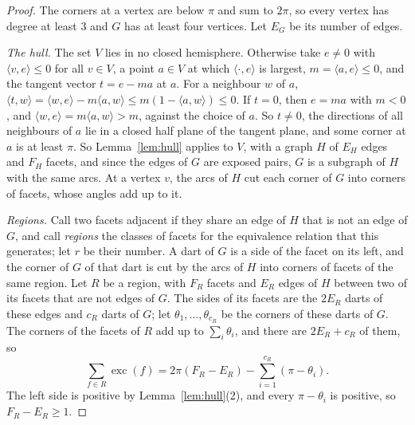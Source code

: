 \documentclass[12pt]{amsart}
\theoremstyle{definition}
\theoremstyle{plain}
\theoremstyle{definition}
\begin{document}
\begin{proof}
The corners at a vertex are below $\pi$ and sum to $2\pi$, so every vertex has degree at least $3$ and $G$ has at least four vertices. Let $E_G$ be its number of edges.

\emph{The hull.} The set $V$ lies in no closed hemisphere. Otherwise take $e\ne0$ with $\langle v,e\rangle\le0$ for all $v\in V$, a point $a\in V$ at which $\langle\cdot,e\rangle$ is largest, $m=\langle a,e\rangle\le0$, and the tangent vector $t=e-ma$ at $a$. For a neighbour $w$ of $a$, $\langle t,w\rangle=\langle w,e\rangle-m\langle a,w\rangle\le m(1-\langle a,w\rangle)\le0$. If $t=0$, then $e=ma$ with $m<0$, and $\langle w,e\rangle=m\langle a,w\rangle>m$, against the choice of $a$. So $t\ne0$, the directions of all neighbours of $a$ lie in a closed half plane of the tangent plane, and some corner at $a$ is at least $\pi$. So Lemma~\ref{lem:hull} applies to $V$, with a graph $H$ of $E_H$ edges and $F_H$ facets, and since the edges of $G$ are exposed pairs, $G$ is a subgraph of $H$ with the same arcs. At a vertex $v$, the arcs of $H$ cut each corner of $G$ into corners of facets, whose angles add up to it.

\emph{Regions.} Call two facets adjacent if they share an edge of $H$ that is not an edge of $G$, and call \emph{regions} the classes of facets for the equivalence relation that this generates; let $r$ be their number. A dart of $G$ is a side of the facet on its left, and the corner of $G$ of that dart is cut by the arcs of $H$ into corners of facets of the same region. Let $R$ be a region, with $F_R$ facets and $E_R$ edges of $H$ between two of its facets that are not edges of $G$. The sides of its facets are the $2E_R$ darts of these edges and $c_R$ darts of $G$; let $\theta_1,\dots,\theta_{c_R}$ be the corners of these darts of $G$. The corners of the facets of $R$ add up to $\sum_i\theta_i$, and there are $2E_R+c_R$ of them, so
\begin{equation}\label{eq:regexc}
\sum_{f\in R}\operatorname{exc}(f)=2\pi(F_R-E_R)-\sum_{i=1}^{c_R}(\pi-\theta_i).
\end{equation}
The left side is positive by Lemma~\ref{lem:hull}(2), and every $\pi-\theta_i$ is positive, so $F_R-E_R\ge1$.


\end{proof}
\end{document}
